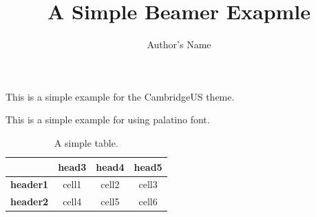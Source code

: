 \documentclass{beamer}
\title{A Simple Beamer Exapmle}
\author{Author's Name}
\institute{Author's Institute}
\begin{document}
\begin{frame}
    \titlepage
\end{frame}

\begin{frame}
    This is a simple example for the CambridgeUS theme.
\end{frame}

\begin{frame}
    This is a simple example for using \alert{palatino} font.
\end{frame}

\begin{frame}
    \begin{table}
        \caption{A simple table.}
        \begin{tabular}{l|ccc}
            \toprule
            & \textbf{head3} & \textbf{head4} & \textbf{head5} \\
            \midrule
            \textbf{header1} & cell1 & cell2 & cell3 \\ 
            \midrule
            \textbf{header2} & cell4 & cell5 & cell6 \\ 
            \bottomrule
        \end{tabular}
    \end{table}
\end{frame}
\end{document}
